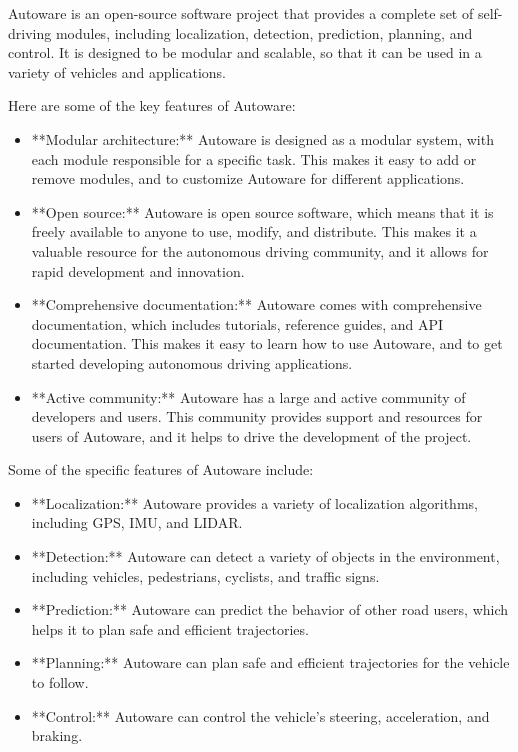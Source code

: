 Autoware is an open-source software project that provides a complete set of self-driving modules, including localization, detection, prediction, planning, and control. It is designed to be modular and scalable, so that it can be used in a variety of vehicles and applications.

Here are some of the key features of Autoware:

\begin{itemize}
  \item **Modular architecture:** Autoware is designed as a modular system, with each module responsible for a specific task. This makes it easy to add or remove modules, and to customize Autoware for different applications.
  \item **Open source:** Autoware is open source software, which means that it is freely available to anyone to use, modify, and distribute. This makes it a valuable resource for the autonomous driving community, and it allows for rapid development and innovation.
  \item **Comprehensive documentation:** Autoware comes with comprehensive documentation, which includes tutorials, reference guides, and API documentation. This makes it easy to learn how to use Autoware, and to get started developing autonomous driving applications.
  \item **Active community:** Autoware has a large and active community of developers and users. This community provides support and resources for users of Autoware, and it helps to drive the development of the project.
\end{itemize}

Some of the specific features of Autoware include:

\begin{itemize}
  \item **Localization:** Autoware provides a variety of localization algorithms, including GPS, IMU, and LIDAR.
  \item **Detection:** Autoware can detect a variety of objects in the environment, including vehicles, pedestrians, cyclists, and traffic signs.
  \item **Prediction:** Autoware can predict the behavior of other road users, which helps it to plan safe and efficient trajectories.
  \item **Planning:** Autoware can plan safe and efficient trajectories for the vehicle to follow.
  \item **Control:** Autoware can control the vehicle's steering, acceleration, and braking.
\end{itemize}


